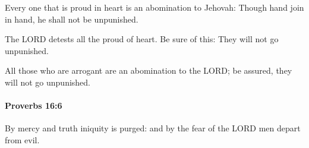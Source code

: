			\begin{versebox}
					\item[BHS] 
					\item[ASV] Every one that is proud in heart is an abomination to Jehovah: Though hand join in hand, he shall not be unpunished.
					\item[NIV] The LORD detests all the proud of heart. Be sure of this: They will not go unpunished.
					\item[NRSV] All those who are arrogant are an abomination to the LORD; be assured, they will not go unpunished.
			\end{versebox}

		\paragraph{Proverbs 16:6} %
			\label{PROVERBS-16-6}

			By mercy and truth iniquity is purged: and by the fear of the LORD men depart from evil.

